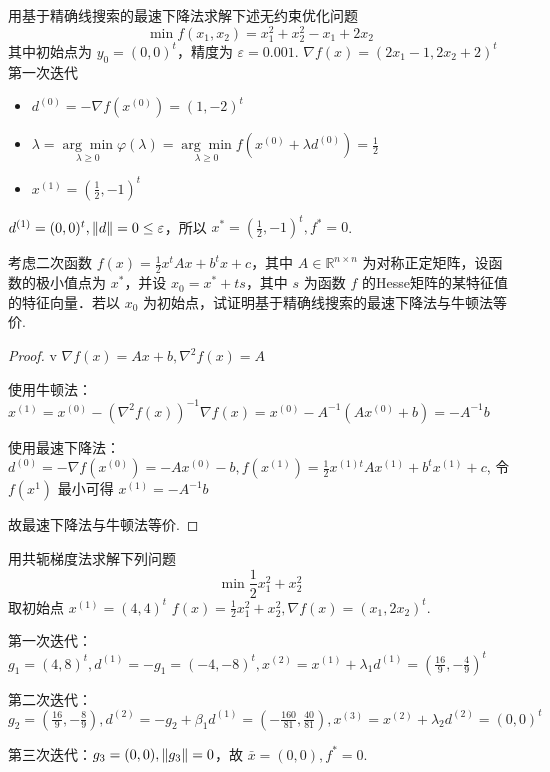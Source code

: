 

\newcommand\Title{最优化方法第11次作业}

\newcommand\subject{\operatorname{subject\ to}}


\begin{problem}
    用基于精确线搜索的最速下降法求解下述无约束优化问题\[\min f(x_1, x_2) = x_1^2 + x_2^2 - x_1 + 2x_2\]
    其中初始点为 $y_0 = (0, 0)^t$，精度为 $\varepsilon = 0.001$.
    \Answer $\nabla f(x) = (2x_1 - 1, 2x_2 + 2)^t$
    第一次迭代
    \begin{itemize}
        \item $d^{(0)} = -\nabla f(x^{(0)}) = (1, -2)^t$
        \item $\lambda = \underset{\lambda \ge 0}{\arg \min}\varphi(\lambda) = \underset{\lambda \ge 0}{\arg \min} f(x^{(0)} + \lambda d^{(0)}) = \frac{1}{2}$
        \item $x^{(1)} = (\frac{1}{2}, -1)^t$
    \end{itemize}
    $d^{(1)} = (0, 0)^t, \norm{d} = 0 \le \varepsilon$，所以 $x^* = (\frac{1}{2}, -1)^t, f^* = 0$.
\end{problem}

\begin{problem}
    考虑二次函数 $f(x) = \frac{1}{2}x^tAx + b^tx + c$，其中 $A \in \mathbb{R}^{n \times n}$ 为对称正定矩阵，设函数的极小值点为 $x^*$，并设 $x_0 = x^* + ts$，其中 $s$ 为函数 $f$ 的Hesse矩阵的某特征值的特征向量．若以 $x_0$ 为初始点，试证明基于精确线搜索的最速下降法与牛顿法等价.
    \begin{proof}v
        $\nabla f(x) = Ax + b, \nabla^2 f(x) = A$

        使用牛顿法：$x^{(1)} = x^{(0)} - (\nabla^2 f(x))^{-1}\nabla f(x) = x^{(0)} - A^{-1}(Ax^{(0)} + b) = -A^{-1}b$
        
        使用最速下降法：$d^{(0)} = -\nabla f(x^{(0)}) = -Ax^{(0)} - b, f(x^{(1)}) = \frac{1}{2}x^{(1)t}Ax^{(1)} + b^tx^{(1)} + c$, 令 $f(x^{1})$ 最小可得 $x^{(1)} = -A^{-1}b$
        
        故最速下降法与牛顿法等价.
    \end{proof}
\end{problem}

\begin{problem}
    用共轭梯度法求解下列问题\[\min \frac{1}{2}x_1^2 + x_2^2\]取初始点 $x^{(1)} = (4, 4)^t$ 
    \Answer $f(x) = \frac{1}{2}x_1^2 + x_2^2, \nabla f(x) = (x_1, 2x_2)^t$.

    第一次迭代：$g_1 = (4, 8)^t, d^{(1)} = -g_1 = (-4, -8)^t, x^{(2)} = x^{(1)} + \lambda_1d^{(1)} = (\frac{16}{9}, -\frac{4}{9})^t$

    第二次迭代：$g_2 = (\frac{16}{9}, -\frac{8}{9}), d^{(2)} = -g_2 + \beta_1d^{(1)} = (-\frac{160}{81}, \frac{40}{81}), x^{(3)} = x^{(2)} + \lambda_2d^{(2)} = (0, 0)^t$

    第三次迭代：$g_3 = (0, 0), \norm{g_3} = 0$，故 $\bar{x} = (0, 0), f^* = 0$.
\end{problem}

